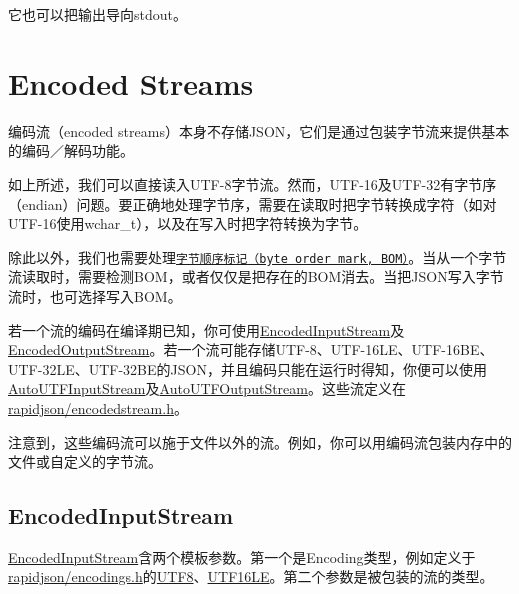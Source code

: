 它也可以把输出导向{\ttfamily stdout}。\hypertarget{md_Cadriciel_Commun_Externe_RapidJSON_doc_stream.zh-cn_EncodedStreams}{}\section{Encoded Streams}\label{md_Cadriciel_Commun_Externe_RapidJSON_doc_stream.zh-cn_EncodedStreams}
编码流（encoded streams）本身不存储\+J\+S\+O\+N，它们是通过包装字节流来提供基本的编码／解码功能。

如上所述，我们可以直接读入\+U\+T\+F-\/8字节流。然而，\+U\+T\+F-\/16及\+U\+T\+F-\/32有字节序（endian）问题。要正确地处理字节序，需要在读取时把字节转换成字符（如对\+U\+T\+F-\/16使用{\ttfamily wchar\+\_\+t}），以及在写入时把字符转换为字节。

除此以外，我们也需要处理\href{http://en.wikipedia.org/wiki/Byte_order_mark}{\tt 字节顺序标记（byte order mark, B\+O\+M）}。当从一个字节流读取时，需要检测\+B\+O\+M，或者仅仅是把存在的\+B\+O\+M消去。当把\+J\+S\+O\+N写入字节流时，也可选择写入\+B\+O\+M。

若一个流的编码在编译期已知，你可使用{\ttfamily \hyperlink{class_encoded_input_stream}{Encoded\+Input\+Stream}}及{\ttfamily \hyperlink{class_encoded_output_stream}{Encoded\+Output\+Stream}}。若一个流可能存储\+U\+T\+F-\/8、\+U\+T\+F-\/16\+L\+E、\+U\+T\+F-\/16\+B\+E、\+U\+T\+F-\/32\+L\+E、\+U\+T\+F-\/32\+B\+E的\+J\+S\+O\+N，并且编码只能在运行时得知，你便可以使用{\ttfamily \hyperlink{class_auto_u_t_f_input_stream}{Auto\+U\+T\+F\+Input\+Stream}}及{\ttfamily \hyperlink{class_auto_u_t_f_output_stream}{Auto\+U\+T\+F\+Output\+Stream}}。这些流定义在{\ttfamily \hyperlink{encodedstream_8h_source}{rapidjson/encodedstream.\+h}}。

注意到，这些编码流可以施于文件以外的流。例如，你可以用编码流包装内存中的文件或自定义的字节流。\hypertarget{md_Cadriciel_Commun_Externe_RapidJSON_doc_stream.zh-cn_EncodedInputStream}{}\subsection{Encoded\+Input\+Stream}\label{md_Cadriciel_Commun_Externe_RapidJSON_doc_stream.zh-cn_EncodedInputStream}
{\ttfamily \hyperlink{class_encoded_input_stream}{Encoded\+Input\+Stream}}含两个模板参数。第一个是{\ttfamily Encoding}类型，例如定义于{\ttfamily \hyperlink{encodings_8h_source}{rapidjson/encodings.\+h}}的{\ttfamily \hyperlink{struct_u_t_f8}{U\+T\+F8}}、{\ttfamily \hyperlink{struct_u_t_f16_l_e}{U\+T\+F16\+LE}}。第二个参数是被包装的流的类型。


